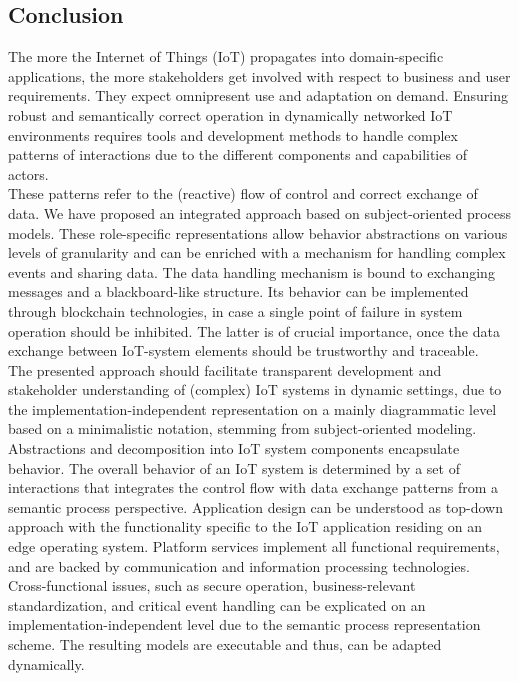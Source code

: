 \subsection {Conclusion}
The more the Internet of Things (IoT) propagates into domain-specific applications, the more stakeholders get involved with respect to business and user requirements. They expect omnipresent use and adaptation on demand. Ensuring robust and semantically correct operation in dynamically networked IoT environments requires tools and development methods to handle complex patterns of interactions due to the different components and capabilities of actors.\\
These patterns refer to the (reactive) flow of control and correct exchange of data. We have proposed an integrated approach based on subject-oriented process models. These role-specific representations allow behavior abstractions on various levels of granularity and can be enriched with a mechanism for handling complex events and sharing data. The data handling mechanism is bound to exchanging messages and a blackboard-like structure. Its behavior can be implemented through blockchain technologies, in case a single point of failure in system operation should be inhibited. The latter is of crucial importance, once the data exchange between IoT-system elements should be trustworthy and traceable.\\
The presented approach should facilitate transparent development and stakeholder understanding of (complex) IoT systems in dynamic settings, due to the implementation-independent representation on a mainly diagrammatic level based on a minimalistic notation, stemming from subject-oriented modeling. Abstractions and decomposition into IoT system components encapsulate behavior. The overall behavior of an IoT system is determined by a set of interactions that integrates the control flow with data exchange patterns from a semantic process perspective. Application design can be understood as top-down approach with the functionality specific to the IoT application residing on an edge operating system. Platform services implement all functional requirements, and are backed by communication and information processing technologies. Cross-functional issues, such as secure operation, business-relevant standardization, and critical event handling can be explicated on an implementation-independent level due to the semantic process representation scheme. The resulting models are executable and thus, can be adapted dynamically.


